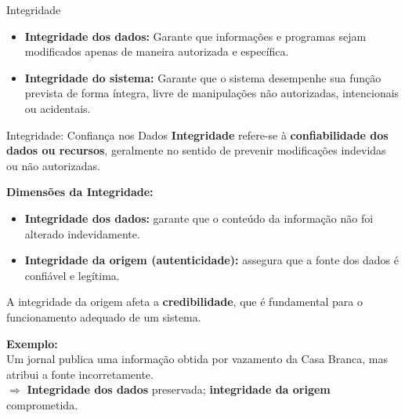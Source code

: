 \begin{frame}{Integridade}

  \begin{itemize}
    \item \textbf{Integridade dos dados:} Garante que informações e programas sejam modificados apenas de maneira autorizada e específica.
    \item \textbf{Integridade do sistema:} Garante que o sistema desempenhe sua função prevista de forma íntegra, livre de manipulações não autorizadas, intencionais ou acidentais.
  \end{itemize}

\end{frame}
\begin{frame}{Integridade: Confiança nos Dados}
  \textbf{Integridade} refere-se à \textbf{confiabilidade dos dados ou recursos}, geralmente no sentido de prevenir modificações indevidas ou não autorizadas.

  \vspace{0.3cm}
  \textbf{Dimensões da Integridade:}
  \begin{itemize}
    \item \textbf{Integridade dos dados:} garante que o conteúdo da informação não foi alterado indevidamente.
    \item \textbf{Integridade da origem (autenticidade):} assegura que a fonte dos dados é confiável e legítima.
  \end{itemize}

  \vspace{0.3cm}
  A integridade da origem afeta a \textbf{credibilidade}, que é fundamental para o funcionamento adequado de um sistema.

  \vspace{0.3cm}
  \textbf{Exemplo:} \\
  Um jornal publica uma informação obtida por vazamento da Casa Branca, mas atribui a fonte incorretamente. \\
  $\Rightarrow$ \textbf{Integridade dos dados} preservada; \textbf{integridade da origem} comprometida.
\end{frame}

